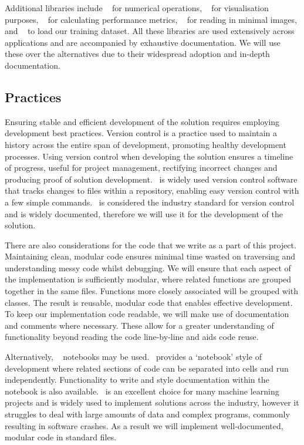 Additional  libraries include ~\cite{numpy} for numerical operations, ~\cite{matplotlib} for visualisation purposes, ~\cite{scikitimage} for calculating performance metrics, ~\cite{openCV} for reading in minimal images, and ~\cite{tensorflowDatasets} to load our training dataset. All these libraries are used extensively across  applications and are accompanied by exhaustive documentation. We will use these over the alternatives due to their widespread adoption and in-depth documentation.

\subsection{Practices}
Ensuring stable and efficient development of the solution requires employing development best practices. Version control is a practice used to maintain a history across the entire span of development, promoting healthy development processes. Using version control when developing the solution ensures a timeline of progress, useful for project management, rectifying incorrect changes and producing proof of solution development.\  is widely used version control software that tracks changes to files within a repository, enabling easy version control with a few simple commands.\  is considered the industry standard for version control and is widely documented, therefore we will use it for the development of the solution.

There are also considerations for the code that we write as a part of this project. Maintaining clean, modular code ensures minimal time wasted on traversing and understanding messy code whilst debugging. We will ensure that each aspect of the implementation is sufficiently modular, where related functions are grouped together in the same  files. Functions more closely associated will be grouped with  classes. The result is reusable, modular code that enables effective development. To keep our implementation code readable, we will make use of documentation and comments where necessary. These allow for a greater understanding of functionality beyond reading the code line-by-line and aids code reuse. 

Alternatively, ~\cite{jupyter} notebooks may be used.\  provides a `notebook' style of development where related sections of code can be separated into cells and run independently. Functionality to write and style documentation within the notebook is also available.\  is an excellent choice for many machine learning projects and is widely used to implement solutions across the industry, however it struggles to deal with large amounts of data and complex programs, commonly resulting in software crashes. As a result we will implement well-documented, modular code in standard  files.

